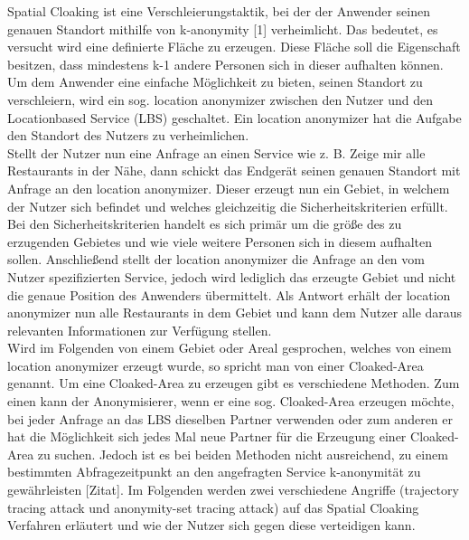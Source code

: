 Spatial Cloaking ist eine Verschleierungstaktik, bei der der Anwender seinen genauen Standort mithilfe von k-anonymity [1] verheimlicht. Das bedeutet, es versucht wird eine definierte Fläche zu erzeugen. Diese Fläche soll die Eigenschaft besitzen, dass mindestens k-1 andere Personen sich in dieser aufhalten können. Um dem Anwender eine einfache Möglichkeit zu bieten, seinen Standort zu verschleiern, wird ein sog. location anonymizer zwischen den Nutzer und den Locationbased Service (LBS) geschaltet. Ein location anonymizer hat die Aufgabe den Standort des Nutzers zu verheimlichen. \\ 
Stellt der Nutzer nun eine Anfrage an einen Service wie z. B. \glqq Zeige mir alle Restaurants in der Nähe\grqq, dann schickt das Endgerät seinen genauen Standort mit Anfrage an den location anonymizer. Dieser erzeugt nun ein Gebiet, in welchem der Nutzer sich befindet und welches gleichzeitig die Sicherheitskriterien erfüllt. Bei den Sicherheitskriterien handelt es sich primär um die größe des zu erzugenden Gebietes und wie viele weitere Personen sich in diesem aufhalten sollen. Anschließend stellt der location anonymizer die Anfrage an den vom Nutzer spezifizierten Service, jedoch wird lediglich das erzeugte Gebiet und nicht die genaue Position des Anwenders übermittelt. Als Antwort erhält der location anonymizer nun alle Restaurants in dem Gebiet und kann dem Nutzer alle daraus relevanten Informationen zur Verfügung stellen.\\ 
Wird im Folgenden von einem Gebiet oder Areal gesprochen, welches von einem location anonymizer erzeugt wurde, so spricht man von einer Cloaked-Area genannt. Um eine Cloaked-Area zu erzeugen gibt es verschiedene Methoden. Zum einen kann der Anonymisierer, wenn er eine sog. Cloaked-Area erzeugen möchte, bei jeder Anfrage an das LBS dieselben Partner verwenden oder zum anderen er hat die Möglichkeit sich jedes Mal neue Partner für die Erzeugung einer Cloaked-Area zu suchen. Jedoch ist es bei beiden Methoden nicht ausreichend, zu einem bestimmten Abfragezeitpunkt an den angefragten Service k-anonymität zu gewährleisten [Zitat]. Im Folgenden werden zwei verschiedene Angriffe (trajectory tracing attack und anonymity-set tracing attack) auf das Spatial Cloaking Verfahren erläutert und wie der Nutzer sich gegen diese verteidigen kann. 

